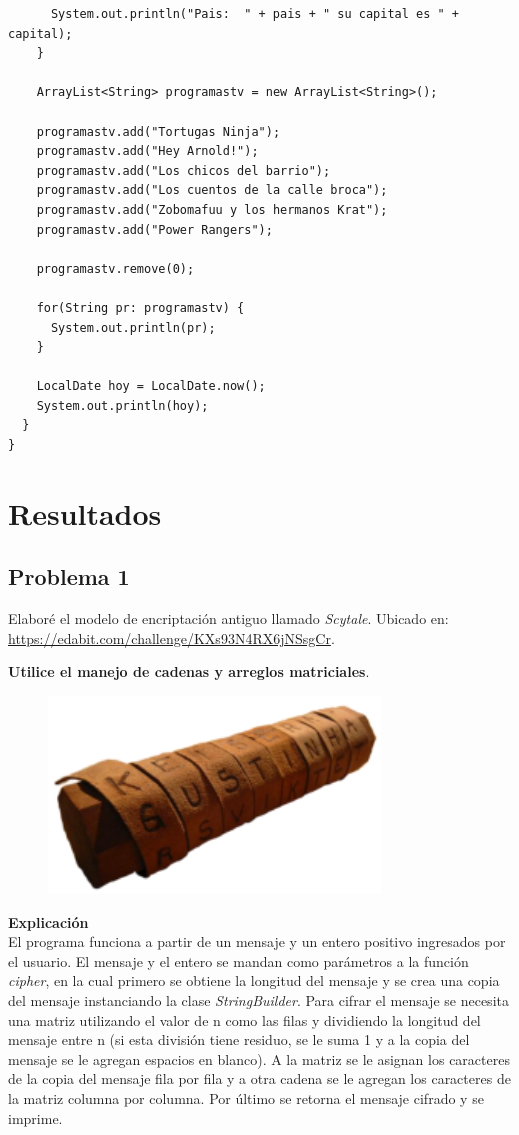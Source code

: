 \documentclass[11pt, twocolumn]{article}
\begin{document}
\begin{lstlisting}
      System.out.println("Pais:  " + pais + " su capital es " + capital);
    }

    ArrayList<String> programastv = new ArrayList<String>();

    programastv.add("Tortugas Ninja");
    programastv.add("Hey Arnold!");
    programastv.add("Los chicos del barrio");
    programastv.add("Los cuentos de la calle broca");
    programastv.add("Zobomafuu y los hermanos Krat");
    programastv.add("Power Rangers");

    programastv.remove(0);

    for(String pr: programastv) {
      System.out.println(pr);
    }

    LocalDate hoy = LocalDate.now();
    System.out.println(hoy);
  }
}
  \end{lstlisting} 

  \section*{Resultados}
  \subsection*{Problema 1}
  Elaboré el modelo de encriptación antiguo llamado \textit{Scytale}. Ubicado en: \url{https://edabit.com/challenge/KXs93N4RX6jNSsgCr}. 
  
  \textbf{Utilice el manejo de cadenas y arreglos matriciales}.

  \begin{figure}[ht]
    \includegraphics[width=0.4\columnwidth, center]{Scytale.png}
  \end{figure}

  \textbf{Explicación} \\
  El programa funciona a partir de un mensaje y un entero positivo ingresados por el usuario. El mensaje y el entero se mandan como parámetros a la función \textit{cipher}, en la cual primero se obtiene la longitud del mensaje y se crea una copia del mensaje instanciando la clase \textit{StringBuilder}. Para cifrar el mensaje se necesita una matriz utilizando el valor de n como las filas y dividiendo la longitud del mensaje entre n (si esta división tiene residuo, se le suma 1 y a la copia del mensaje se le agregan espacios en blanco). A la matriz se le asignan los caracteres de la copia del mensaje fila por fila y a otra cadena se le agregan los caracteres de la matriz columna por columna. Por último se retorna el mensaje cifrado y se imprime.
\end{document}

